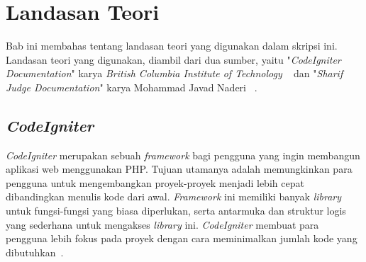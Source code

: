 \chapter{Landasan Teori}
\label{chap:teori}

Bab ini membahas tentang landasan teori yang digunakan dalam skripsi ini. Landasan teori yang digunakan, diambil dari dua sumber, yaitu "\textit{CodeIgniter Documentation}" karya \textit{British Columbia Institute of Technology} ~\cite{bcit:17:cidoc} dan "\textit{Sharif Judge Documentation}" karya Mohammad Javad Naderi ~\cite{mjnaderi:14:sharifjudgedoc}.

\section{\textit{CodeIgniter}}
\label{sec:codeigniter} 
 
\textit{CodeIgniter} merupakan sebuah \textit{framework} bagi pengguna yang ingin membangun aplikasi web menggunakan PHP. Tujuan utamanya adalah memungkinkan para pengguna untuk mengembangkan proyek-proyek menjadi lebih cepat dibandingkan menulis kode dari awal. \textit{Framework} ini memiliki banyak \textit{library} untuk fungsi-fungsi yang biasa diperlukan, serta antarmuka dan struktur logis yang sederhana untuk mengakses \textit{library} ini. \textit{CodeIgniter} membuat para pengguna lebih fokus pada proyek dengan cara meminimalkan jumlah kode yang dibutuhkan~\cite{bcit:17:cidoc}. \\

